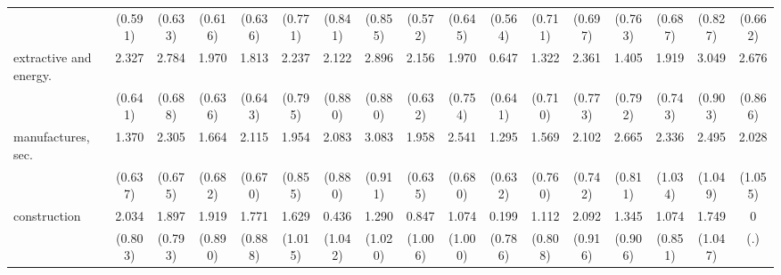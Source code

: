 {\begin{tabular}{l*{16}{c}}
                    &     (0.591)         &     (0.633)         &     (0.616)         &     (0.636)         &     (0.771)         &     (0.841)         &     (0.855)         &     (0.572)         &     (0.645)         &     (0.564)         &     (0.711)         &     (0.697)         &     (0.763)         &     (0.687)         &     (0.827)         &     (0.662)         \\
[1em]
extractive and energy.&       2.327\sym{***}&       2.784\sym{***}&       1.970\sym{**} &       1.813\sym{**} &       2.237\sym{**} &       2.122\sym{*}  &       2.896\sym{***}&       2.156\sym{***}&       1.970\sym{**} &       0.647         &       1.322         &       2.361\sym{**} &       1.405         &       1.919\sym{**} &       3.049\sym{***}&       2.676\sym{**} \\
                    &     (0.641)         &     (0.688)         &     (0.636)         &     (0.643)         &     (0.795)         &     (0.880)         &     (0.880)         &     (0.632)         &     (0.754)         &     (0.641)         &     (0.710)         &     (0.773)         &     (0.792)         &     (0.743)         &     (0.903)         &     (0.866)         \\
[1em]
manufactures, sec.  &       1.370\sym{*}  &       2.305\sym{***}&       1.664\sym{*}  &       2.115\sym{**} &       1.954\sym{*}  &       2.083\sym{*}  &       3.083\sym{***}&       1.958\sym{**} &       2.541\sym{***}&       1.295\sym{*}  &       1.569\sym{*}  &       2.102\sym{**} &       2.665\sym{**} &       2.336\sym{*}  &       2.495\sym{*}  &       2.028         \\
                    &     (0.637)         &     (0.675)         &     (0.682)         &     (0.670)         &     (0.855)         &     (0.880)         &     (0.911)         &     (0.635)         &     (0.680)         &     (0.632)         &     (0.760)         &     (0.742)         &     (0.811)         &     (1.034)         &     (1.049)         &     (1.055)         \\
[1em]
construction        &       2.034\sym{*}  &       1.897\sym{*}  &       1.919\sym{*}  &       1.771\sym{*}  &       1.629         &       0.436         &       1.290         &       0.847         &       1.074         &       0.199         &       1.112         &       2.092\sym{*}  &       1.345         &       1.074         &       1.749         &           0         \\
                    &     (0.803)         &     (0.793)         &     (0.890)         &     (0.888)         &     (1.015)         &     (1.042)         &     (1.020)         &     (1.006)         &     (1.000)         &     (0.786)         &     (0.808)         &     (0.916)         &     (0.906)         &     (0.851)         &     (1.047)         &         (.)         \\

\end{tabular}}
